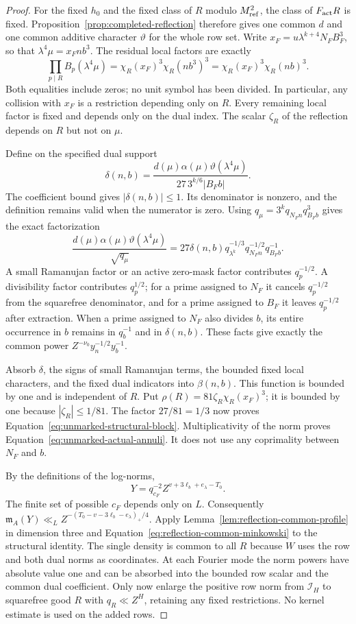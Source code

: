 \documentclass[11pt,a4paper]{article}
\numberwithin{equation}{section}
\numberwithin{figure}{section}
\theoremstyle{definition}
\theoremstyle{remark}
\begin{document}
\begin{proof}
For the fixed $h_0$ and the fixed class of $R$ modulo $M_{\rm ref}^2$, the
class of $F_{\rm act}R$ is fixed.  Proposition~\ref{prop:completed-reflection}
therefore gives one common $d$ and one common additive character
$\vartheta$ for the whole row set.  Write $x_F=u\lambda^{k+4}N_FB_F^3$,
so that $\lambda^4\mu=x_Fnb^3$.  The residual local factors are exactly
\[
 \prod_{p\mid R}B_p(\lambda^4\mu)
 =\chi_R(x_F)^3\chi_R(nb^3)^3
 =\chi_R(x_F)^3\chi_R(nb)^3.
\]
Both equalities include zeros; no unit symbol has been divided.  In
particular, any collision with $x_F$ is a restriction depending only on $R$.
Every remaining local factor is fixed and depends only on the dual index.
The scalar $\zeta_R$ of the reflection depends on $R$ but not on $\mu$.

Define on the specified dual support
\[
 \delta(n,b)=
 \frac{d(\mu)\alpha(\mu)\vartheta(\lambda^4\mu)}
      {27\,3^{k/6}|B_Fb|}.
\]
The coefficient bound gives $|\delta(n,b)|\le1$.  Its denominator is
nonzero, and the definition remains valid when the numerator is zero.
Using $q_\mu=3^kq_{N_Fn}q_{B_Fb}^3$ gives the exact factorization
\[
 \frac{d(\mu)\alpha(\mu)\vartheta(\lambda^4\mu)}{\sqrt{q_\mu}}
 =27\delta(n,b)q_{\lambda^k}^{-1/3}
                  q_{N_Fn}^{-1/2}q_{B_Fb}^{-1}.
\]
A small Ramanujan factor or an active zero-mask factor contributes
$q_p^{-1/2}$.  A divisibility factor contributes $q_p^{1/2}$; for a prime
assigned to $N_F$ it cancels $q_p^{-1/2}$ from the squarefree denominator,
and for a prime assigned to $B_F$ it leaves $q_p^{-1/2}$ after extraction.
When a prime assigned to $N_F$ also divides $b$, its entire occurrence in
$b$ remains in $q_b^{-1}$ and in $\delta(n,b)$.  These facts give exactly
the common power $Z^{-\nu_0}y_n^{-1/2}y_b^{-1}$.

Absorb $\delta$, the signs of small Ramanujan terms, the bounded fixed local
characters, and the fixed dual indicators into $\beta(n,b)$.  This function
is bounded by one and is independent of $R$.  Put
$\rho(R)=81\zeta_R\chi_R(x_F)^3$; it is bounded by one because
$|\zeta_R|\le1/81$.  The factor $27/81=1/3$ now proves
Equation~\eqref{eq:unmarked-structural-block}.  Multiplicativity of the norm
proves Equation~\eqref{eq:unmarked-actual-annuli}.  It does not use any
coprimality between $N_F$ and $b$.

By the definitions of the log-norms,
\[
 Y=q_{c_F}^{-2}Z^{v+3\ell_b+e_\lambda-T_0}.
\]
The finite set of possible $c_F$ depends only on $L$.  Consequently
$\mathfrak m_A(Y)\ll_L Z^{-(T_0-v-3\ell_b-e_\lambda)_+/4}$.
Apply Lemma~\ref{lem:reflection-common-profile} in dimension three and
Equation~\eqref{eq:reflection-common-minkowski} to the structural identity.
The single density is common to all $R$ because $W$ uses the row and both
dual norms as coordinates.  At each Fourier mode the norm powers have
absolute value one and can be absorbed into the bounded row scalar and the
common dual coefficient.  Only now enlarge the positive row norm from
$\mathcal I_H$ to squarefree good $R$ with $q_R\ll Z^H$, retaining any
fixed restrictions.  No kernel estimate is used on the added rows.


\end{proof}
\end{document}
